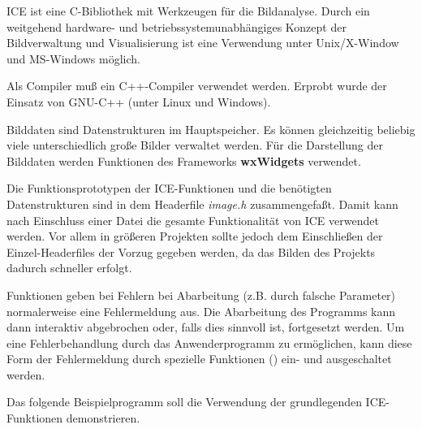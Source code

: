 

ICE ist eine C-Bibliothek mit Werkzeugen für die Bildanalyse. Durch 
ein weitgehend hardware- und betriebssystemunabhängiges
Konzept der Bildverwaltung und Visualisierung ist eine Verwendung
unter Unix/X-Window und MS-Windows möglich. 

Als Compiler muß ein C++-Compiler verwendet werden. Erprobt wurde der 
Einsatz von GNU-C++ (unter Linux und Windows). 

Bilddaten sind Datenstrukturen im Hauptspeicher. Es können gleichzeitig
beliebig viele unterschiedlich große Bilder verwaltet werden. 
Für die Darstellung der Bilddaten werden Funktionen des Frameworks {\bf wxWidgets}
verwendet.

Die Funktionsprototypen der ICE-Funktionen und die benötigten Datenstrukturen
sind in dem Headerfile {\em image.h} zusammengefaßt. Damit kann nach Einschluss 
einer Datei die gesamte Funktionalität von ICE verwendet werden. Vor allem 
in größeren Projekten sollte jedoch dem Einschließen der Einzel-Headerfiles 
der Vorzug gegeben werden, da das Bilden des Projekts dadurch schneller erfolgt.

Funktionen geben bei Fehlern bei Abarbeitung (z.B. durch falsche Parameter) 
normalerweise eine Fehlermeldung aus. Die Abarbeitung des Programms kann dann
interaktiv abgebrochen oder, falls dies sinnvoll ist, fortgesetzt werden. Um 
eine Fehlerbehandlung durch das Anwenderprogramm zu ermöglichen, kann diese 
Form der Fehlermeldung durch spezielle Funktionen () ein- und 
ausgeschaltet werden.

Das folgende Beispielprogramm soll die Verwendung der grundlegenden
ICE-Funktionen demonstrieren.

